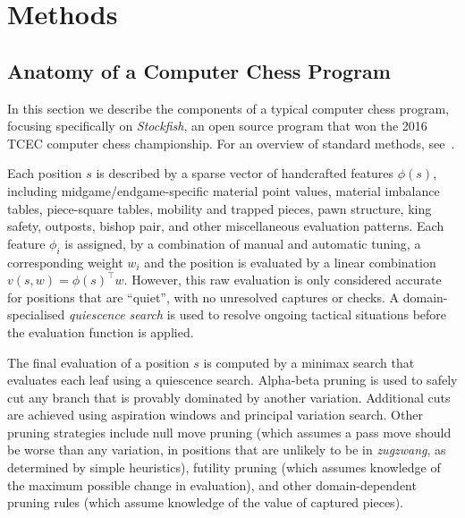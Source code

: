 \documentclass[12pt]{article}
\begin{document}



\newpage

\setcounter{table}{0}
\renewcommand{\thetable}{S\arabic{table}}\setcounter{figure}{0}
\renewcommand{\thefigure}{S\arabic{figure}}

\section*{Methods}

\subsection*{Anatomy of a Computer Chess Program}

In this section we describe the components of a typical computer chess program, focusing specifically on \emph{Stockfish}\cite{Stockfish}, an open source program that won the 2016 TCEC computer chess championship. 
For an overview of standard methods, see~\cite{Marsland87}.

Each position $s$ is described by a sparse vector of 
handcrafted features $\phi(s)$, including midgame/endgame-specific material point values, material imbalance tables, piece-square tables, mobility and trapped pieces, pawn structure, king safety, outposts, bishop pair, and other miscellaneous evaluation patterns.
Each feature $\phi_i$ is assigned, by a combination of manual and automatic tuning, a corresponding weight $w_i$ and the position is evaluated by a linear combination $v(s,w) = \phi(s)^\top w$. However, this raw evaluation is only considered accurate for positions that are ``quiet'', with no unresolved captures or checks. A domain-specialised \emph{quiescence search} is used to resolve ongoing tactical situations before the evaluation function is applied.

The final evaluation of a position $s$ is computed by a minimax search that evaluates each leaf using a quiescence search. Alpha-beta pruning is used to safely cut any branch that is provably dominated by another variation. Additional cuts are achieved using aspiration windows and principal variation search.
Other pruning strategies include null move pruning (which assumes a pass move should be worse than any variation, in positions that are unlikely to be in \emph{zugzwang}, as determined by simple heuristics), futility pruning (which assumes knowledge of the maximum possible change in evaluation), and other domain-dependent pruning rules (which assume knowledge of the value of captured pieces).
\end{document}
